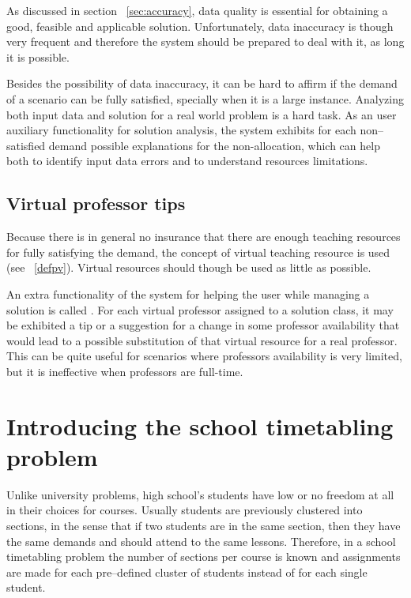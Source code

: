 As discussed in section ~\ref{sec:accuracy}, data quality is essential for obtaining a good, feasible and applicable solution. Unfortunately, data inaccuracy is though very frequent and therefore the system should be prepared to deal with it, as long it is possible.

Besides the possibility of data inaccuracy, it can be hard to affirm if the demand of a scenario can be fully satisfied, specially when it is a large instance. Analyzing both input data and solution for a real world problem is a hard task. As an user auxiliary functionality for solution analysis, the system exhibits for each non--satisfied demand possible explanations for the non-allocation, which can help both to identify input data errors and to understand resources limitations.


\subsection{Virtual professor tips}
\label{subsec:tips}

Because there is in general no insurance that there are enough teaching resources for fully satisfying the demand, the concept of virtual teaching resource is used (see ~\ref{defpv}). Virtual resources should though be used as little as possible.

An extra functionality of the system for helping the user while managing a solution is called . For each virtual professor assigned to a solution class, it may be exhibited a tip or a suggestion for a change in some professor availability that would lead to a possible substitution of that virtual resource for a real professor. This can be quite useful for scenarios where professors availability is very limited, but it is ineffective when professors are full-time.




\section{Introducing the school timetabling problem}
\label{deftriedaschool}


Unlike university problems, high school's students have low or no freedom at all in their choices for courses. Usually students are previously clustered into sections, in the sense that if two students are in the same section, then they have the same demands and should attend to the same lessons. Therefore, in a school timetabling problem the number of sections per course is known and assignments are made for each pre--defined cluster of students instead of for each single student.

